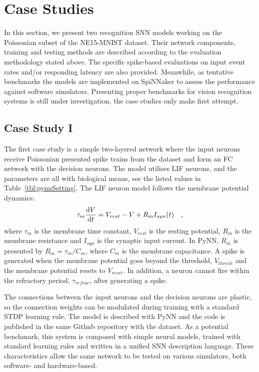 \section{Case Studies}
\label{sec:test}
In this section, we present two recognition SNN models working on the Poissonian subset of the NE15-MNIST dataset.
Their network components, training and testing methods are described according to the evaluation methodology stated above.
The specific spike-based evaluations on input event rates and/or responding latency are also provided. 
Meanwhile, as tentative benchmarks the models are implemented on SpiNNaker to assess the performance against software simulators.
Presenting proper benchmarks for vision recognition systems is still under investigation, the case studies only make first attempt.

\subsection{Case Study I}
The first case study is a simple two-layered network where the input neurons receive Poissonian presented spike trains from the dataset and form an FC network with the decision neurons.
The model utilises LIF neurons, and the parameters are all with biological means, see the listed values in Table~\ref{tbl:pynnSetting}.
The LIF neuron model follows the membrane potential
dynamics:
\begin{equation}
    \tau_m \frac{\mathrm{d} V}{\mathrm{d} t}=V_{rest} - V + R_{m} I_{syn}(t) ~~~,
    \label{eq:LIF}
\end{equation}
where $\tau_m$ is the membrane time constant, $ V_{rest} $ is the resting potential, $ R_{m} $ is the membrane resistance and $ I_{syn} $ is the synaptic input current.
In PyNN, $ R_{m} $ is presented by $ R_{m}=\tau_m/C_{m} $, where $C_{m} $ is the membrane capacitance.
A spike is generated when the membrane potential goes beyond the threshold, $ V_{thresh} $ and the membrane potential resets to $V_{reset}$.
In addition, a neuron cannot fire within the refractory period, $ \tau_{refrac} $, after generating a spike.

The connections between the input neurons and the decision neurons are plastic, so the connection weights can be modulated during training with a standard STDP learning rule.
The model is described with PyNN and the code is published in
the same Github repository with the dataset.
As a potential benchmark, this system is composed with simple neural models, trained with standard learning rules and written in a unified SNN description language. These characteristics allow the same network to be tested on various simulators, both software- and hardware-based.

